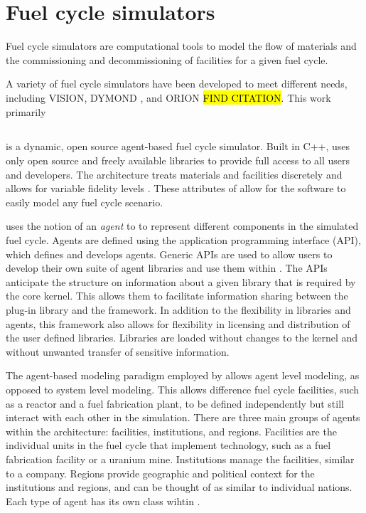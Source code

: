\section{Fuel cycle simulators}
Fuel cycle simulators are computational tools to model the flow of materials
and the commissioning and decommissioning of facilities for a given fuel 
cycle. 

A variety of fuel cycle simulators have been developed to meet 
different needs, including VISION\cite{yacout_visionverifiable_2006}, 
DYMOND \cite{yacout_visionverifiable_2006}, and ORION \hl{FIND CITATION}. 
This work primarily 

\subsection{\Cyclus}
\Cyclus is a dynamic, open source agent-based fuel cycle simulator. Built 
in C++, \Cyclus uses only open source and freely available libraries to 
provide full access to all users and developers. The 
\Cyclus architecture treats materials and facilities discretely and allows 
for variable fidelity levels \cite{huff_fundamental_2016}. These attributes
of \Cyclus allow for the software to easily model any fuel cycle scenario.

\Cyclus uses the notion of an \textit{agent} to to represent different 
components in the simulated fuel cycle. Agents are 
defined using the \Cyclus application programming interface (API), which 
defines and develops agents. Generic APIs are used to allow users 
to develop their own suite of agent libraries and use them within \Cyclus. 
The APIs anticipate the structure on information about a given library 
that is required by the core \Cyclus kernel. This allows them to facilitate 
information sharing between the plug-in library and the \Cyclus framework. 
In addition to the flexibility in libraries and agents, this framework 
also allows for flexibility in licensing and distribution of the user 
defined libraries. Libraries are loaded without changes to the \Cyclus 
kernel and without unwanted transfer of sensitive information. 

The agent-based modeling paradigm employed by \Cyclus allows agent level 
modeling, as opposed to system level modeling. This allows difference 
fuel cycle facilities, such as a reactor and a fuel fabrication plant, to 
be defined independently but still interact with each other in the 
simulation. There are three main groups of agents within the \Cyclus 
architecture: facilities, institutions, and regions. Facilities are 
the individual units in the fuel cycle that implement technology, 
such as a fuel fabrication facility or a uranium mine. Institutions 
manage the facilities, similar to a company. Regions provide geographic 
and political context for the institutions and regions, and can be thought 
of as similar to individual nations. Each type of agent has its own 
class wihtin \Cyclus. 

